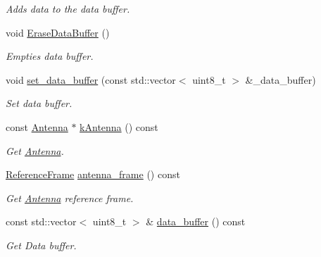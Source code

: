 \begin{DoxyCompactItemize}
\begin{DoxyCompactList}\small\item\em Adds data to the data buffer. \end{DoxyCompactList}\item 
\mbox{\label{classosse_1_1collaborate_1_1_subsystem_sensing_a637cf0e89bc362c63d4b66f493fab083}} 
void \hyperlink{classosse_1_1collaborate_1_1_subsystem_sensing_a637cf0e89bc362c63d4b66f493fab083}{Erase\+Data\+Buffer} ()
\begin{DoxyCompactList}\small\item\em Empties data buffer. \end{DoxyCompactList}\item 
void \hyperlink{classosse_1_1collaborate_1_1_subsystem_sensing_a8d770dd2a5632d02759baeaa6fb3e590}{set\+\_\+data\+\_\+buffer} (const std\+::vector$<$ uint8\+\_\+t $>$ \&\+\_\+data\+\_\+buffer)
\begin{DoxyCompactList}\small\item\em Set data buffer. \end{DoxyCompactList}\item 
const \hyperlink{classosse_1_1collaborate_1_1_antenna}{Antenna} $\ast$ \hyperlink{classosse_1_1collaborate_1_1_subsystem_sensing_a7f87c28bdaa990f8f94116b096db9e59}{k\+Antenna} () const
\begin{DoxyCompactList}\small\item\em Get \hyperlink{classosse_1_1collaborate_1_1_antenna}{Antenna}. \end{DoxyCompactList}\item 
\hyperlink{classosse_1_1collaborate_1_1_reference_frame}{Reference\+Frame} \hyperlink{classosse_1_1collaborate_1_1_subsystem_sensing_a3fbab25a150abeec9081d0441234613c}{antenna\+\_\+frame} () const
\begin{DoxyCompactList}\small\item\em Get \hyperlink{classosse_1_1collaborate_1_1_antenna}{Antenna} reference frame. \end{DoxyCompactList}\item 
const std\+::vector$<$ uint8\+\_\+t $>$ \& \hyperlink{classosse_1_1collaborate_1_1_subsystem_sensing_a094f36e93f5eaa7fa64ddfd7c5194192}{data\+\_\+buffer} () const
\begin{DoxyCompactList}\small\item\em Get Data buffer. \end{DoxyCompactList}\item 

\end{DoxyCompactItemize}
